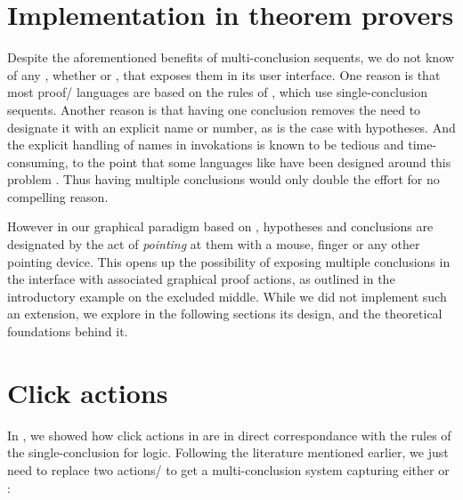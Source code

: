 \begin{scope}
\section{Implementation in theorem provers}

Despite the aforementioned benefits of multi-conclusion sequents, we do not know
of any , whether  or , that exposes them
in its user interface. One reason is that most proof/ languages are based
on the rules of , which use single-conclusion sequents. Another
reason is that having one conclusion removes the need to designate it with an
explicit name or number, as is the case with hypotheses. And the explicit handling
of names in  invokations is known to be tedious and time-consuming, to the
point that some  languages like \ssreflect have been designed around this
problem . Thus having multiple conclusions would only double the
effort for no compelling reason.

However in our graphical paradigm based on , hypotheses and
conclusions are designated by the act of \emph{pointing} at them with a mouse,
finger or any other pointing device. This opens up the possibility of exposing
multiple conclusions in the interface with associated graphical proof actions,
as outlined in the introductory example on the excluded middle. While we did not
implement such an extension, we explore in the following sections its design,
and the theoretical foundations behind it.

\section{Click actions}

In , we showed how click actions in  are in direct
correspondance with the rules of the single-conclusion  
for  logic. Following the literature mentioned earlier, we just
need to replace two actions/ to get a multi-conclusion system
capturing either  or  :


\end{scope}
